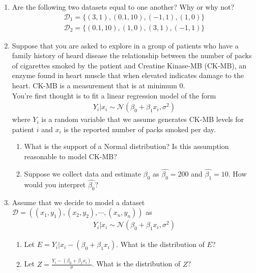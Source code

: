 \begin{enumerate}
    \item Are the following two datasets equal to one another? Why or why not? 
    \begin{align}
        \mathcal{D}_{1} = \{ (3,1),(0.1,10),(-1,1),(1,0) \}\\
        \mathcal{D}_{2} = \{(0.1,10), (1,0),(3,1),(-1,1) \}
    \end{align}
    
    \item  Suppose that you are asked to explore in a group of patients who have a family history of heard disease the relationship between the number of packs of cigarettes smoked by the patient and Creatine Kinase-MB (CK-MB), an enzyme found in heart muscle that when elevated indicates damage to the heart.
    CK-MB is a measurement that is at minimum 0.\\
    
    You're first thought is to fit a linear regression model of the form
    \begin{align}
        Y_{i}| x_{i} \sim \mathcal{N}\left( \beta_{0} + \beta_{1} x_{i}, \sigma^{2} \right)
    \end{align}
    where $Y_{i}$ is a random variable that we assume generates CK-MB levels for patient $i$ and $x_{i}$ is the reported number of packs smoked per day. 
    
    \begin{enumerate}
        \item What is the support of a Normal distribution? Is this assumption reasonable to model CK-MB? 
        \item Suppose we collect data and estimate $\beta_{0}$ as $\hat{\beta_{0}} = 200$ and $\hat{\beta_{1}} = 10$. 
        How would you interpret $\hat{\beta_{0}}$?
    \end{enumerate}


    \item Assume that we decide to model a dataset $\mathcal{D} = ( (x_{1},y_{1}),(x_{2},y_{2}),\cdots,(x_{n},y_{n})  )$ as 
    \begin{align}
        Y_{i} | x_{i} \sim \mathcal{N}\left( \beta_{0} + \beta_{1} x_{i}, \sigma^{2} \right)
    \end{align}
    
    \begin{enumerate}
        \item Let $E = Y_{i} | x_{i} - (\beta_{0} + \beta_{1} x_{i})$. 
        What is the distribution of $E$? 
        \item Let $Z = \frac{Y_{i} - (\beta_{0} + \beta_{1} x_{i})}{\sigma}$. What is the distribution of $Z$?
    \end{enumerate}
    

\end{enumerate}
